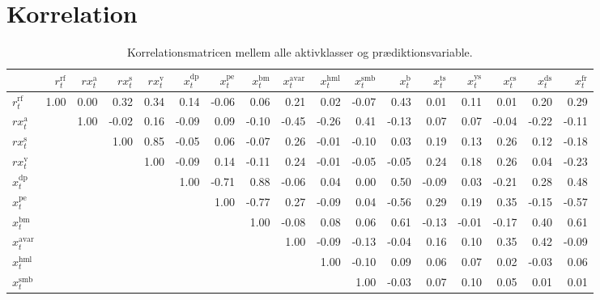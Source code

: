\documentclass[
  a4paper,
  oneside]{memoir}
\begin{document}
\hypertarget{korr}{%
\section{Korrelation}\label{korr}}

\begin{landscape}
\begin{table}[!h]

\caption{\label{tab:DES-KOR}Korrelationsmatricen mellem alle aktivklasser og prædiktionsvariable.}
\centering
\begin{threeparttable}
\begin{tabular}[t]{lrrrrrrrrrrrrrrrr}
\toprule
  & $r_t^{\text{rf}}$ & $rx_t^{\text{a}}$ & $rx_t^{\text{s}}$ & $rx_t^{\text{v}}$ & $x_t^{\text{dp}}$ & $x_t^{\text{pe}}$ & $x_t^{\text{bm}}$ & $x_t^{\text{avar}}$ & $x_t^{\text{hml}}$ & $x_t^{\text{smb}}$ & $x_t^{\text{b}}$ & $x_t^{\text{ts}}$ & $x_t^{\text{ys}}$ & $x_t^{\text{cs}}$ & $x_t^{\text{ds}}$ & $x_t^{\text{fr}}$\\
\midrule
\rowcolor{gray!6}  $r_t^{\text{rf}}$ & 1.00 & 0.00 & 0.32 & 0.34 & 0.14 & -0.06 & 0.06 & 0.21 & 0.02 & -0.07 & 0.43 & 0.01 & 0.11 & 0.01 & 0.20 & 0.29\\
$rx_t^{\text{a}}$ &  & 1.00 & -0.02 & 0.16 & -0.09 & 0.09 & -0.10 & -0.45 & -0.26 & 0.41 & -0.13 & 0.07 & 0.07 & -0.04 & -0.22 & -0.11\\
\rowcolor{gray!6}  $rx_t^{\text{s}}$ &  &  & 1.00 & 0.85 & -0.05 & 0.06 & -0.07 & 0.26 & -0.01 & -0.10 & 0.03 & 0.19 & 0.13 & 0.26 & 0.12 & -0.18\\
$rx_t^{\text{v}}$ &  &  &  & 1.00 & -0.09 & 0.14 & -0.11 & 0.24 & -0.01 & -0.05 & -0.05 & 0.24 & 0.18 & 0.26 & 0.04 & -0.23\\
\rowcolor{gray!6}  $x_t^{\text{dp}}$ &  &  &  &  & 1.00 & -0.71 & 0.88 & -0.06 & 0.04 & 0.00 & 0.50 & -0.09 & 0.03 & -0.21 & 0.28 & 0.48\\
$x_t^{\text{pe}}$ &  &  &  &  &  & 1.00 & -0.77 & 0.27 & -0.09 & 0.04 & -0.56 & 0.29 & 0.19 & 0.35 & -0.15 & -0.57\\
\rowcolor{gray!6}  $x_t^{\text{bm}}$ &  &  &  &  &  &  & 1.00 & -0.08 & 0.08 & 0.06 & 0.61 & -0.13 & -0.01 & -0.17 & 0.40 & 0.61\\
$x_t^{\text{avar}}$ &  &  &  &  &  &  &  & 1.00 & -0.09 & -0.13 & -0.04 & 0.16 & 0.10 & 0.35 & 0.42 & -0.09\\
\rowcolor{gray!6}  $x_t^{\text{hml}}$ &  &  &  &  &  &  &  &  & 1.00 & -0.10 & 0.09 & 0.06 & 0.07 & 0.02 & -0.03 & 0.06\\
$x_t^{\text{smb}}$ &  &  &  &  &  &  &  &  &  & 1.00 & -0.03 & 0.07 & 0.10 & 0.05 & 0.01 & 0.01\\

\end{tabular}
\end{threeparttable}
\end{table}
\end{landscape}
\end{document}
